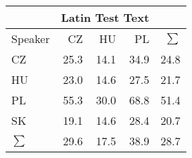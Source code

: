 \begin{tabular}{l|rrr|r}
\hline
 & \multicolumn{3}{c}{Latin Test Text} & \\
\hline
 Speaker   &   CZ &   HU &   PL &   $\sum$ \\
\hline
 CZ        & 25.3 & 14.1 & 34.9 &     24.8 \\
 HU        & 23.0 & 14.6 & 27.5 &     21.7 \\
 PL        & 55.3 & 30.0 & 68.8 &     51.4 \\
 SK        & 19.1 & 14.6 & 28.4 &     20.7 \\
\hline
 $\sum$   & 29.6 & 17.5 & 38.9 &     28.7 \\
\hline
\end{tabular}